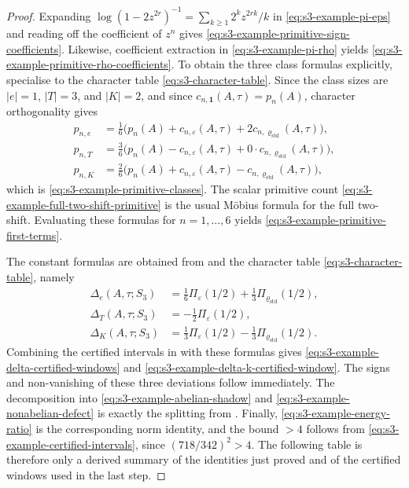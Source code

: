 \begin{proof}
  Expanding \(\log(1-2z^{2r})^{-1}=\sum_{k\ge 1}2^k z^{2rk}/k\) in
  \eqref{eq:s3-example-pi-eps} and reading off the coefficient of
  \(z^n\) gives \eqref{eq:s3-example-primitive-sign-coefficients}.
  Likewise, coefficient extraction in \eqref{eq:s3-example-pi-rho}
  yields \eqref{eq:s3-example-primitive-rho-coefficients}. To obtain the
  three class formulas explicitly, specialise
   to the character table
  \eqref{eq:s3-character-table}. Since the class sizes are
  \(|e|=1\), \(|T|=3\), and \(|K|=2\), and since
  \(c_{n,\mathbf1}(A,\tau)=p_n(A)\), character orthogonality gives
  \[
    \begin{aligned}
    p_{n,e}
      &=\frac{1}{6}\bigl(p_n(A)+c_{n,\varepsilon}(A,\tau)
        +2c_{n,\varrho_{\mathrm{std}}}(A,\tau)\bigr),\\
    p_{n,T}
      &=\frac{3}{6}\bigl(p_n(A)-c_{n,\varepsilon}(A,\tau)
        +0\cdot c_{n,\varrho_{\mathrm{std}}}(A,\tau)\bigr),\\
    p_{n,K}
      &=\frac{2}{6}\bigl(p_n(A)+c_{n,\varepsilon}(A,\tau)
        -c_{n,\varrho_{\mathrm{std}}}(A,\tau)\bigr),
    \end{aligned}
  \]
  which is \eqref{eq:s3-example-primitive-classes}. The scalar primitive
  count \eqref{eq:s3-example-full-two-shift-primitive} is the usual
  M\"obius formula for the full two-shift. Evaluating these formulas for
  \(n=1,\dots,6\) yields
  \eqref{eq:s3-example-primitive-first-terms}.

  The constant formulas are obtained from
   and the character table
  \eqref{eq:s3-character-table}, namely
  \[
    \begin{aligned}
      \Delta_e(A,\tau;S_3)
      &=\frac{1}{6}\Pi_\varepsilon(1/2)+\frac{1}{3}\Pi_{\varrho_{\mathrm{std}}}(1/2), \\
      \Delta_T(A,\tau;S_3)
      &=-\frac{1}{2}\Pi_\varepsilon(1/2), \\
      \Delta_K(A,\tau;S_3)
      &=\frac{1}{3}\Pi_\varepsilon(1/2)-\frac{1}{3}\Pi_{\varrho_{\mathrm{std}}}(1/2).
    \end{aligned}
  \]
  Combining the certified intervals in
   with these formulas gives
  \eqref{eq:s3-example-delta-certified-windows} and
  \eqref{eq:s3-example-delta-k-certified-window}. The signs and
  non-vanishing of these three deviations follow immediately.
  The decomposition into
  \eqref{eq:s3-example-abelian-shadow} and
  \eqref{eq:s3-example-nonabelian-defect} is exactly the splitting from
  . Finally,
  \eqref{eq:s3-example-energy-ratio} is the corresponding norm identity,
  and the bound \(>4\) follows from
  \eqref{eq:s3-example-certified-intervals}, since
  \((718/342)^2>4\). The following table is therefore only a derived summary
  of the identities just proved and of the certified windows used in the last
  step.
\end{proof}

